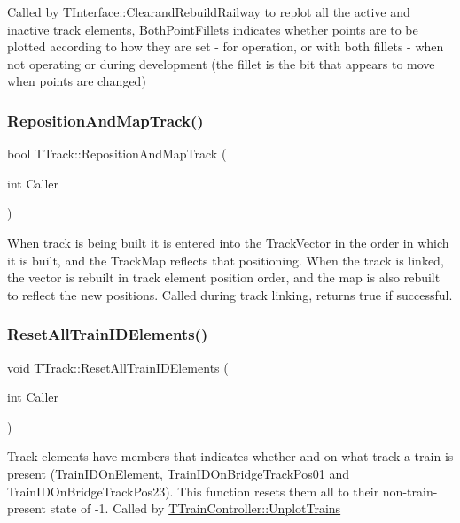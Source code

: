 Called by T\+Interface\+::\+Clearand\+Rebuild\+Railway to replot all the active and inactive track elements, Both\+Point\+Fillets indicates whether points are to be plotted according to how they are set -\/ for operation, or with both fillets -\/ when not operating or during development (the fillet is the bit that appears to move when points are changed) \mbox{\label{class_t_track_a5e2e215fae5247206220d301c324e9a0}} 
\subsubsection{\texorpdfstring{Reposition\+And\+Map\+Track()}{RepositionAndMapTrack()}}
{\footnotesize\ttfamily bool T\+Track\+::\+Reposition\+And\+Map\+Track (\begin{DoxyParamCaption}\item[{int}]{Caller }\end{DoxyParamCaption})}

When track is being built it is entered into the Track\+Vector in the order in which it is built, and the Track\+Map reflects that positioning. When the track is linked, the vector is rebuilt in track element position order, and the map is also rebuilt to reflect the new positions. Called during track linking, returns true if successful. \mbox{\label{class_t_track_a9430d0a48a27e59f41015c5812aa5de2}} 
\subsubsection{\texorpdfstring{Reset\+All\+Train\+I\+D\+Elements()}{ResetAllTrainIDElements()}}
{\footnotesize\ttfamily void T\+Track\+::\+Reset\+All\+Train\+I\+D\+Elements (\begin{DoxyParamCaption}\item[{int}]{Caller }\end{DoxyParamCaption})}

Track elements have members that indicates whether and on what track a train is present (Train\+I\+D\+On\+Element, Train\+I\+D\+On\+Bridge\+Track\+Pos01 and Train\+I\+D\+On\+Bridge\+Track\+Pos23). This function resets them all to their non-\/train-\/present state of -\/1. Called by \mbox{\hyperlink{class_t_train_controller_a7e2abfcc38e51933883d959c4155aca0}{T\+Train\+Controller\+::\+Unplot\+Trains}} \mbox{\label{class_t_track_a1be0a43c6b1dc736d981fe7d883d7f01}} 
